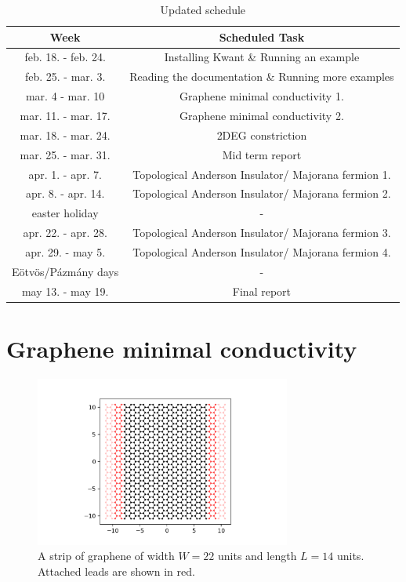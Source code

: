\documentclass[12pt]{article}
\numberwithin{equation}{section}
\begin{document}
\newpage
\begin{table}[ht]
  \centering
  \caption{Updated schedule}
  \begin{tabular}{|c|c|}
  \hline
  Week & Scheduled Task \\ [0.5ex]  \hline %
  feb. 18. - feb. 24. & Installing Kwant \& Running an example \\ \hline
  feb. 25. - mar. 3. & Reading the documentation \& Running more examples \\ \hline
  mar. 4 - mar. 10 & Graphene minimal conductivity 1. \\ \hline 
  mar. 11. - mar. 17. & Graphene minimal conductivity 2. \\ \hline
  mar. 18. -  mar. 24. & 2DEG constriction \\ \hline
  mar. 25. -  mar. 31. & Mid term report \\ \hline
  apr. 1. -  apr. 7. & Topological Anderson Insulator/ Majorana fermion 1. \\ \hline
  apr. 8. -  apr. 14. & Topological Anderson Insulator/ Majorana fermion 2. \\ \hline
  easter holiday & - \\ \hline
  apr. 22. - apr. 28. & Topological Anderson Insulator/ Majorana fermion 3. \\ \hline 
  apr. 29. - may 5. & Topological Anderson Insulator/ Majorana fermion 4. \\ \hline 
  Eötvös/Pázmány days & - \\ \hline
  may 13. - may 19. & Final report \\ \hline

  \end{tabular}
\end{table}


\newpage
\section{Graphene minimal conductivity}
\begin{figure}[h!]
  \begin{center}
  \includegraphics[width=0.75\textwidth]{Graphene_with_leads_w22_l14.png}
  \caption{A strip of graphene of width $W=22$ units and length $L=14$ units. Attached leads are shown in red.}
  \label{fig:qwire}
  \end{center}
\end{figure}
\end{document}
